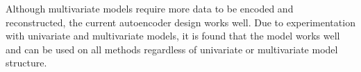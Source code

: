 Although multivariate models require more data to be encoded and reconstructed,
the current autoencoder design works well.
Due to experimentation with univariate and multivariate models,
it is found that the model works well and can be used on all methods regardless of univariate or multivariate model structure.




